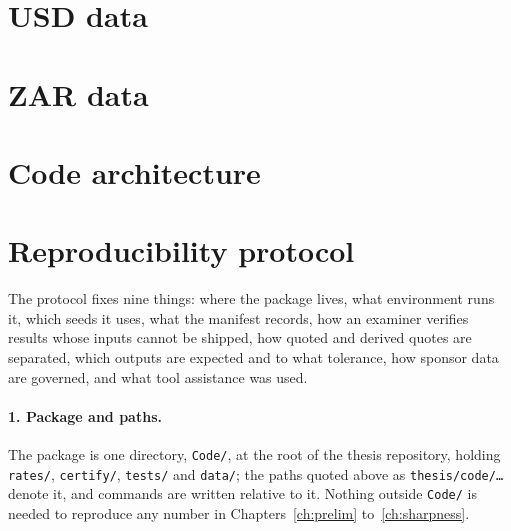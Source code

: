 \documentclass[../../main.tex]{subfiles}
\begin{document}
\section{USD data}\label{sec:appC-usd}
\section{ZAR data}\label{sec:appC-zar}
\section{Code architecture}\label{sec:appC-code}

\section{Reproducibility protocol}\label{sec:appC-protocol}

The protocol fixes nine things: where the package lives, what environment runs it, which seeds it uses, what the manifest records, how an examiner verifies results whose inputs cannot be shipped, how quoted and derived quotes are separated, which outputs are expected and to what tolerance, how sponsor data are governed, and what tool assistance was used.

\paragraph{1. Package and paths.} The package is one directory, \texttt{Code/}, at the root of the thesis repository, holding \texttt{rates/}, \texttt{certify/}, \texttt{tests/} and \texttt{data/}; the paths quoted above as \texttt{thesis/code/\ldots} denote it, and commands are written relative to it. Nothing outside \texttt{Code/} is needed to reproduce any number in Chapters~\ref{ch:prelim} to~\ref{ch:sharpness}.

\end{document}
